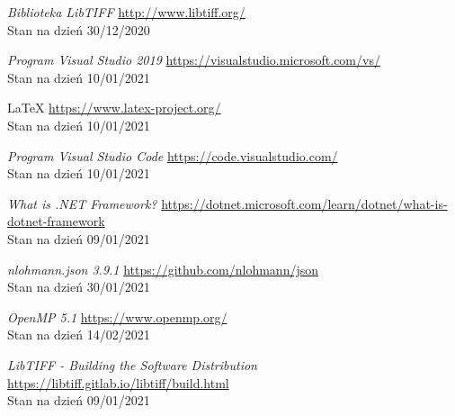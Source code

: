 \documentclass{article}
\begin{document}
\begin{thebibliography}{9}
        \textit{Biblioteka LibTIFF}
        \url{http://www.libtiff.org/}\\
        Stan na dzień 30/12/2020

        \textit{Program Visual Studio 2019}
        \url{https://visualstudio.microsoft.com/vs/}\\
        Stan na dzień 10/01/2021

        \LaTeX \space
        \url{https://www.latex-project.org/}\\
        Stan na dzień 10/01/2021

        \textit{Program Visual Studio Code}
        \url{https://code.visualstudio.com/}\\
        Stan na dzień 10/01/2021

        \textit{What is .NET Framework?}
        \url{https://dotnet.microsoft.com/learn/dotnet/what-is-dotnet-framework}\\
        Stan na dzień 09/01/2021

        \textit{nlohmann.json 3.9.1}
        \url{https://github.com/nlohmann/json}\\
        Stan na dzień 30/01/2021

        \textit{OpenMP 5.1}
        \url{https://www.openmp.org/}\\
        Stan na dzień 14/02/2021

        \textit{LibTIFF - Building the Software Distribution}
        \url{https://libtiff.gitlab.io/libtiff/build.html}\\
        Stan na dzień 09/01/2021

    \end{thebibliography}
    \newpage
    \listoffigures
\end{document}
